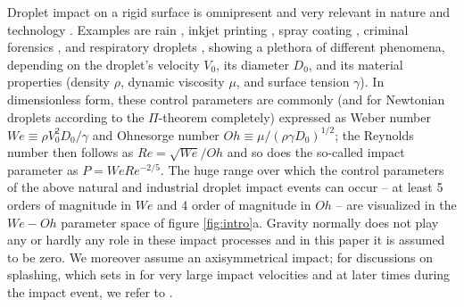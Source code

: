 \documentclass[preprint,amssymb,superscriptaddress,aps,prl,floatfix]{revtex4-1}
\begin{document}
\maketitle


Droplet impact on a rigid surface is omnipresent and very relevant in 
nature and technology \cite{Josserand2016,yarin2006drop,Yarin2017}. 
Examples are 
rain  \cite{worthington1877xxviii}, inkjet printing  \cite{lohse2022fundamental}, spray coating \cite{kim2007spray}, criminal forensics \cite{smith2018influence},  
and respiratory droplets  \cite{bouroubia2021-arfm}, showing 
a plethora of different phenomena, depending on the droplet's  velocity $V_0$, 
its diameter $D_0$,
and its material properties (density $\rho$, dynamic  viscosity $\mu$,  and surface 
tension $\gamma$). In dimensionless form, these control parameters are 
commonly (and for Newtonian droplets according to the $\Pi$-theorem 
completely) 
expressed 
as Weber number $We\equiv \rho V_0^2 D_0 /\gamma $ and 
Ohnesorge number $Oh\equiv \mu / (\rho \gamma D_0 )^{1/2} $; the Reynolds number then follows
as $Re = \sqrt{We}/Oh$ and so does the so-called impact parameter as $P= We Re^{-2/5}$. 
The huge range over which the control parameters of the above natural and industrial
droplet impact events can occur
-- %
at least 5 orders of magnitude in $We$ and 4 order of magnitude in $Oh$
--
are visualized in the $We-Oh$ parameter space of
figure \ref{fig:intro}a. 
Gravity normally does not play any or hardly any role in  these impact processes and
in this paper it is assumed to be zero. We moreover assume
an axisymmetrical impact; for discussions on splashing, 
which sets in for very large impact velocities and at later
times during the impact event, 
we refer to \cite{sanjayzhang2022prl}.
\end{document}
